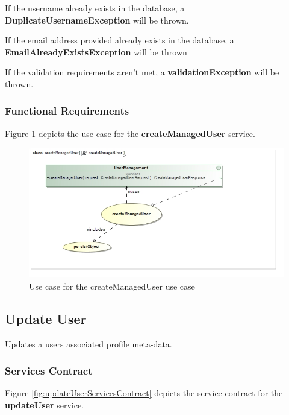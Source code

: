 If the username already exists in the database, a \textbf{DuplicateUsernameException} will be thrown.

If the email address provided already exists in the database, a \textbf{EmailAlreadyExistsException}
will be thrown

If the validation requirements aren't met, a \textbf{validationException} will be thrown.

\subsubsection{Functional Requirements}
Figure \ref{fig:createManagedUserUseCase} depicts the use case for the \textbf{createManagedUser} service.

\begin{figure}[H]
	\begin{center}
		\includegraphics[scale=0.55]{../Diagrams and Charts/Users/Create Managed User Use Case.jpg}
		\caption{Use case for the createManagedUser use case}
		\label{fig:createManagedUserUseCase}
	\end{center}
\end{figure}
\subsection{Update User}
Updates a users associated profile meta-data.

\subsubsection{Services Contract}
Figure \ref{fig:updateUserServicesContract} depicts the service contract for the \textbf{updateUser} service.

